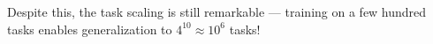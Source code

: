 Despite this, the task scaling is still remarkable — training on a few hundred tasks enables generalization to   $4^{10} \approx 10^6$ tasks!



















